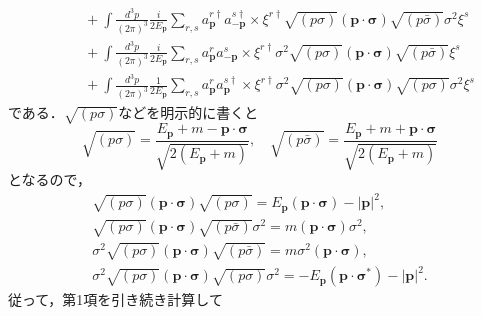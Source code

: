 \begin{align*}
  & \qquad + \int \frac{d^3p}{(2\pi)^3} \frac{i}{2E_{\boldsymbol{p}}}
  \sum_{r, s} a_{\boldsymbol{p}}^{r\dagger} a_{-\boldsymbol{p}}^{s\dagger}
  \times \xi^{r\dagger} \sqrt{(p \sigma)} (\boldsymbol{p} \cdot \boldsymbol{\sigma}) \sqrt{(p \bar\sigma)} \sigma^2 \xi^s \\
  & \qquad + \int \frac{d^3p}{(2\pi)^3} \frac{i}{2E_{\boldsymbol{p}}}
  \sum_{r, s} a_{\boldsymbol{p}}^{r} a_{-\boldsymbol{p}}^s
  \times \xi^{r\dagger} \sigma^2 \sqrt{(p \sigma)} (\boldsymbol{p} \cdot \boldsymbol{\sigma}) \sqrt{(p \bar\sigma)} \xi^s \\
  & \qquad + \int \frac{d^3p}{(2\pi)^3} \frac{1}{2E_{\boldsymbol{p}}}
  \sum_{r, s} a_{\boldsymbol{p}}^{r} a_{\boldsymbol{p}}^{s\dagger}
  \times \xi^{r\dagger} \sigma^2 \sqrt{(p \sigma)} (\boldsymbol{p} \cdot \boldsymbol{\sigma}) \sqrt{(p \sigma)} \sigma^2 \xi^s
\end{align*}
である．$\sqrt{(p\sigma)}$などを明示的に書くと
\[ \sqrt{(p \sigma)} = \frac{E_{\boldsymbol{p}} + m - \boldsymbol{p} \cdot \boldsymbol{\sigma}}{\sqrt{2 (E_{\boldsymbol{p}} + m)}} , \quad \sqrt{(p \bar\sigma)} = \frac{E_{\boldsymbol{p}} + m + \boldsymbol{p} \cdot \boldsymbol{\sigma}}{\sqrt{2 (E_{\boldsymbol{p}} + m)}} \]
となるので，
\begin{align*}
  \sqrt{(p \sigma)} (\boldsymbol{p} \cdot \boldsymbol{\sigma}) \sqrt{(p \sigma)} = E_{\boldsymbol{p}} (\boldsymbol{p} \cdot \boldsymbol{\sigma}) - \lvert \boldsymbol{p} \rvert^2 , \\
  \sqrt{(p \sigma)} (\boldsymbol{p} \cdot \boldsymbol{\sigma}) \sqrt{(p \bar\sigma)} \sigma^2 = m (\boldsymbol{p} \cdot \boldsymbol{\sigma}) \sigma^2 , \\
  \sigma^2 \sqrt{(p \sigma)} (\boldsymbol{p} \cdot \boldsymbol{\sigma}) \sqrt{(p \bar\sigma)} = m \sigma^2 (\boldsymbol{p} \cdot \boldsymbol{\sigma}) , \\
  \sigma^2 \sqrt{(p \sigma)} (\boldsymbol{p} \cdot \boldsymbol{\sigma}) \sqrt{(p \sigma)} \sigma^2 = - E_{\boldsymbol{p}} (\boldsymbol{p} \cdot \boldsymbol{\sigma}^\ast) - \lvert \boldsymbol{p} \rvert^2 .
\end{align*}
従って，第1項を引き続き計算して
